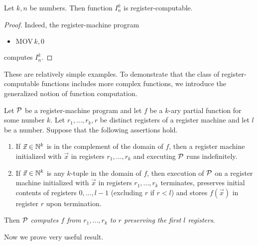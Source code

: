 \documentclass[10pt]{amsart}
\begin{document}
\begin{fact}\label{fact:projections_are_register_computable}
	Let $k,n$ be numbers. Then function $I^k_n$ is register-computable.
\end{fact}
\begin{proof}
	Indeed, the register-machine program
	\begin{itemize}
		\item[] $\mathrm{MOV}\,k,0$
	\end{itemize}
	computes $I^k_n$.
\end{proof}
\noindent
These are relatively simple examples. To demonstrate that the class of register-computable functions includes more complex functions, we introduce the generalized notion of function computation.

\begin{definition}
	Let ${\mathcal P}$ be a register-machine program and let $f$ be a $k$-ary partial function for some number $k$. Let $r_1,...,r_k, r$ be distinct registers of a register machine and let $l$ be a number. Suppose that the following assertions hold.
	\begin{enumerate}[label=\textbf{(\arabic*)}, leftmargin=3.0em]
		\item If $\vec{x} \in {\mathbb N}^k$ is in the complement of the domain of $f$, then a register machine initialized with $\vec{x}$ in registers $r_1,...,r_k$ and executing ${\mathcal P}$ runs indefinitely.
		\item If $\vec{x} \in {\mathbb N}^k$ is any $k$-tuple in the domain of $f$, then execution of ${\mathcal P}$ on a register machine initialized with $\vec{x}$ in registers $r_1,...,r_k$ terminates, preserves initial contents of registers $0,...,l-1$ (excluding $r$ if $r < l$) and stores $f(\vec{x})$ in register $r$ upon termination.
	\end{enumerate}
	Then ${\mathcal P}$ \textit{computes $f$ from $r_1,...,r_k$ to $r$ preserving the first $l$ registers}.
\end{definition}
\noindent
Now we prove very useful result.
\end{document}
